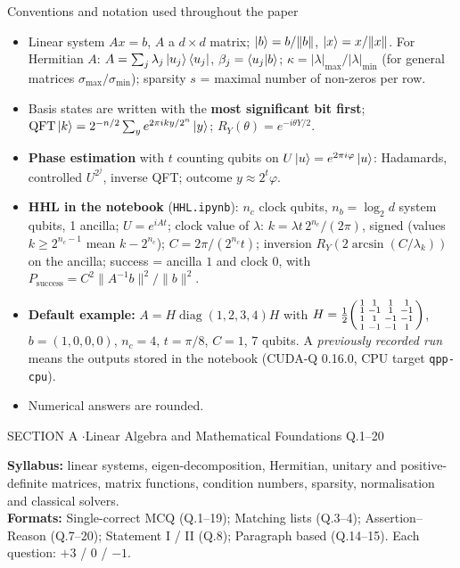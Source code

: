 \documentclass[11pt,a4paper]{article}
\begin{document}
\begin{infobox}{Conventions and notation used throughout the paper}
\small
\begin{itemize}[leftmargin=1.2em, itemsep=1pt, topsep=2pt]
\item Linear system $Ax = b$, $A$ a $d\times d$ matrix; $\ket b = b/\|b\|$, $\ket x = x/\|x\|$. For Hermitian $A$: $A = \sum_j\lambda_j\ket{u_j}\bra{u_j}$, $\beta_j = \braket{u_j|b}$;
      $\kappa = |\lambda|_{\max}/|\lambda|_{\min}$ (for general matrices $\sigma_{\max}/\sigma_{\min}$); sparsity $s$ = maximal number of non-zeros per row.
\item Basis states are written with the \textbf{most significant bit first}; $\mathrm{QFT}\ket k = 2^{-n/2}\sum_y e^{2\pi iky/2^n}\ket y$; $R_Y(\theta) = e^{-i\theta Y/2}$.
\item \textbf{Phase estimation} with $t$ counting qubits on $U\ket u = e^{2\pi i\varphi}\ket u$: Hadamards, controlled $U^{2^j}$, inverse QFT; outcome $y \approx 2^t\varphi$.
\item \textbf{HHL in the notebook} (\texttt{HHL.ipynb}): $n_c$ clock qubits, $n_b = \log_2d$ system qubits, 1 ancilla; $U = e^{iAt}$; clock value of $\lambda$:
      $k = \lambda t\,2^{n_c}/(2\pi)$, signed (values $k \ge 2^{n_c-1}$ mean $k - 2^{n_c}$); $C = 2\pi/(2^{n_c}t)$; inversion $R_Y(2\arcsin(C/\lambda_k))$ on the ancilla;
      success = ancilla $1$ and clock $0$, with $P_{\text{success}} = C^2\|A^{-1}b\|^2/\|b\|^2$.
\item \textbf{Default example:} $A = H\operatorname{diag}(1, 2, 3, 4)H$ with $H = \tfrac12\begin{psmallmatrix}1&1&1&1\\1&-1&1&-1\\1&1&-1&-1\\1&-1&-1&1\end{psmallmatrix}$, $b = (1, 0, 0, 0)$, $n_c = 4$, $t = \pi/8$, $C = 1$,
      7 qubits. A \emph{previously recorded run} means the outputs stored in the notebook (CUDA-Q 0.16.0, CPU target \texttt{qpp-cpu}).
\item Numerical answers are rounded.
\end{itemize}
\end{infobox}
\newpage

\begin{sectionbanner}SECTION A \enspace$\cdot$\enspace Linear Algebra and Mathematical Foundations \hfill Q.1--20\end{sectionbanner}

{\small \textbf{Syllabus:} linear systems, eigen-decomposition, Hermitian, unitary and positive-definite matrices, matrix functions, condition numbers, sparsity, normalisation and classical solvers.\\ \textbf{Formats:} Single-correct MCQ (Q.1--19); Matching lists (Q.3--4); Assertion--Reason (Q.7--20); Statement I / II (Q.8); Paragraph based (Q.14--15). Each question: $+3$ / $0$ / $-1$.}
\par\medskip
\end{document}
